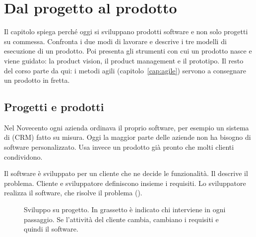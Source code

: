 \chapter{Dal progetto al prodotto}
\label{cap:prodotti}

\begin{inbreve}
Il capitolo spiega perché oggi si sviluppano prodotti software e non solo progetti su commessa. Confronta i due modi
di lavorare e descrive i tre modelli di esecuzione di un prodotto. Poi presenta gli strumenti con cui un prodotto
nasce e viene guidato: la product vision, il product management e il prototipo. Il resto del corso parte da qui:
i metodi agili (capitolo~\ref{cap:agile}) servono a consegnare un prodotto in fretta.
\end{inbreve}

\section{Progetti e prodotti}
\label{sec:prodotti-progetti}

Nel Novecento ogni azienda ordinava il proprio software, per esempio un sistema di  (CRM) fatto su misura. Oggi la maggior parte delle aziende non ha bisogno di software personalizzato.
Usa invece un prodotto già pronto che molti clienti condividono.

\begin{definizione}
Il software è sviluppato per un cliente che ne decide le funzionalità. Il  descrive il problema.
Cliente e sviluppatore definiscono insieme i requisiti. Lo sviluppatore realizza il software, che risolve il
problema ().
\end{definizione}

\begin{figure}[ht]
\centering
{}
\caption{Sviluppo su progetto. In grassetto è indicato chi interviene in ogni passaggio. Se l'attività del cliente
cambia, cambiano i requisiti e quindi il software.}
\label{fig:prodotti-progetto}
\end{figure}


